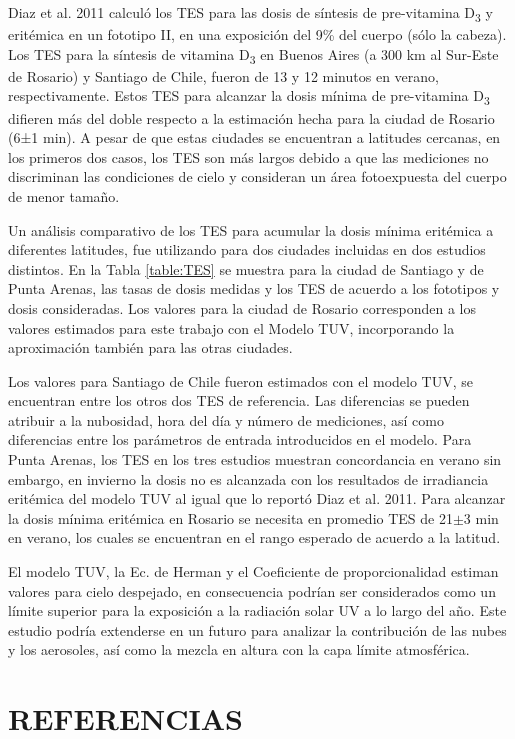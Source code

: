 \documentclass[10pt,twocolumn]{article}
\begin{document}
Diaz et al. 2011 calculó los TES para las dosis de síntesis de pre-vitamina D\textsubscript{3} y eritémica en un fototipo II, en una exposición del 9\% del cuerpo (sólo la cabeza). Los TES para la síntesis de vitamina D\textsubscript{3} en Buenos Aires (a 300 km al Sur-Este de Rosario) y Santiago de Chile, fueron de 13 y 12 minutos en verano, respectivamente.\cite{IPINA2012966} Estos TES para alcanzar la dosis mínima de pre-vitamina D\textsubscript{3} difieren más del doble respecto a la estimación hecha para la ciudad de Rosario (6±1 min). A pesar de que estas ciudades se encuentran a latitudes cercanas, en los primeros dos casos, los TES son más largos debido a que las mediciones no discriminan las condiciones de cielo y consideran un área fotoexpuesta del cuerpo de menor tamaño.

Un análisis comparativo de los TES para acumular la dosis mínima eritémica a diferentes latitudes, fue utilizando para dos ciudades incluidas en dos estudios distintos.\cite{Diaz2011,cabrera_radiacion_2005}  En la Tabla \ref{table:TES} se muestra para la ciudad de Santiago y de Punta Arenas, las tasas de dosis medidas y los TES de acuerdo a los fototipos y dosis consideradas. Los valores para la ciudad de Rosario corresponden a los valores estimados para este trabajo con el Modelo TUV, incorporando la aproximación también para las otras ciudades.

Los valores para Santiago de Chile fueron estimados con el modelo TUV, se encuentran entre los otros dos TES de referencia. Las diferencias se pueden atribuir a la nubosidad, hora del día y número de mediciones, así como diferencias entre los parámetros de entrada introducidos en el modelo. Para Punta Arenas, los TES en los tres estudios muestran concordancia en verano sin embargo, en invierno la dosis no es alcanzada con los resultados de irradiancia eritémica del modelo TUV al igual que lo reportó Diaz et al. 2011. Para alcanzar la dosis mínima eritémica en Rosario se necesita en promedio TES de 21$\pm$3 min en verano, los cuales se encuentran en el rango esperado de acuerdo a la latitud.

El modelo TUV, la Ec. de Herman y el Coeficiente de proporcionalidad estiman valores para cielo despejado, en consecuencia podrían ser considerados como un límite superior para la exposición a la radiación solar UV a lo largo del año. Este estudio podría extenderse en un futuro para analizar la contribución de las nubes y los aerosoles,\cite{Kim2020} así como la mezcla en altura con la capa límite atmosférica.
\section{REFERENCIAS}
\renewcommand{\refname}{}

\end{document}
